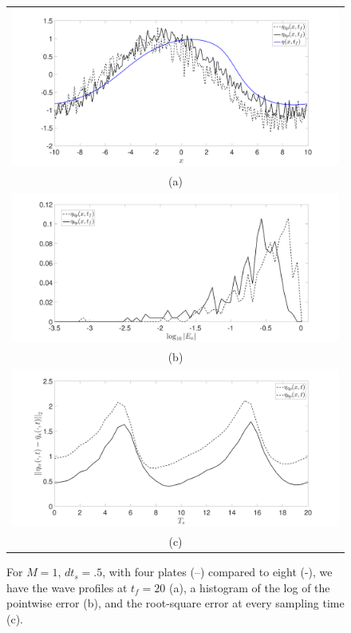 \begin{figure}
\centering
\begin{tabular}{c}
\includegraphics[width=.95\textwidth]{Images/wave_tf_20_sig_pt1_4_vs8pplates_Mval_1} \\
(a)\\
\includegraphics[width=.95\textwidth]{Images/histogram_tf_20_sig_pt1_4_vs8pplates_Mval_1}\\
(b)\\
\includegraphics[width=.95\textwidth]{Images/rmserr_tf_20_sig_pt1_4_vs8pplates_Mval_1}\\
(c)
\end{tabular}
\caption{For $M=1$, $dt_{s}=.5$, with four plates (--) compared to eight (-), we have the wave profiles at $t_{f}=20$ (a), a histogram of the log of the pointwise error (b), and the root-square error at every sampling time (c).} 
\label{fig:Mval_1}
\end{figure}

